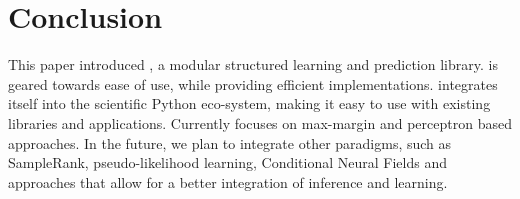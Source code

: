 

\section{Conclusion}
This paper introduced \pystruct, a modular structured learning and prediction library.
\pystruct is geared towards ease of use, while providing efficient implementations.
\pystruct integrates itself into the scientific Python eco-system, making it easy to use with
existing libraries and applications.
Currently \pystruct focuses on max-margin and perceptron based approaches. In the future,
we plan to integrate other paradigms, such as SampleRank, pseudo-likelihood learning,
Conditional Neural Fields and approaches that allow for a better integration of inference
and learning.
